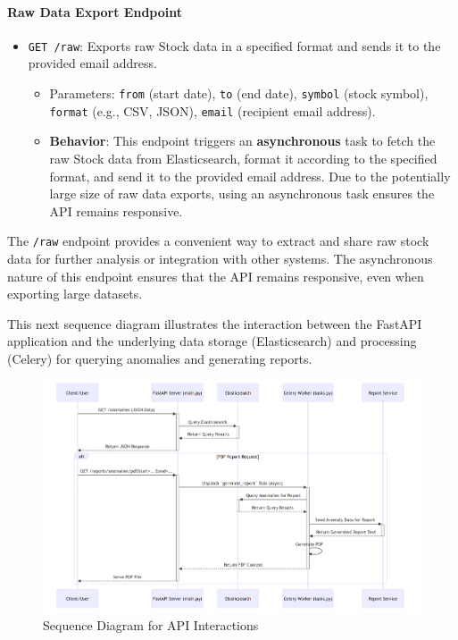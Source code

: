 \paragraph{Raw Data Export Endpoint}
\begin{itemize}
    \item \verb|GET /raw|: Exports raw Stock data in a specified format and sends it to the provided email address.
    \begin{itemize}
        \item Parameters: \verb|from| (start date), \verb|to| (end date), \verb|symbol| (stock symbol), \verb|format| (e.g., CSV, JSON), \verb|email| (recipient email address).
        \item \textbf{Behavior}: This endpoint triggers an \textbf{asynchronous} task to fetch the raw Stock data from Elasticsearch, format it according to the specified format, and send it to the provided email address. Due to the potentially large size of raw data exports, using an asynchronous task ensures the API remains responsive.
    \end{itemize}
\end{itemize}



The \verb|/raw| endpoint provides a convenient way to extract and share raw stock data for further analysis or integration with other systems. The asynchronous nature of this endpoint ensures that the API remains responsive, even when exporting large datasets.



This next sequence diagram illustrates the interaction between the FastAPI application and the underlying data storage (Elasticsearch) and processing (Celery) for querying anomalies and generating reports.


\begin{figure}[H]
    \centering
    \includegraphics[width=1.2\textwidth,angle=90]{figures/api-1.png}
    \caption{Sequence Diagram for API Interactions}
    \label{fig:class_diagram_data_model}
\end{figure}

